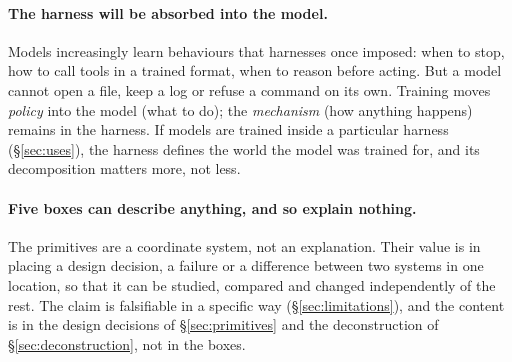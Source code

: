 \paragraph{The harness will be absorbed into the model.} Models increasingly learn behaviours that harnesses once imposed: when to stop, how to call tools in a trained format, when to reason before acting. But a model cannot open a file, keep a log or refuse a command on its own. Training moves \emph{policy} into the model (what to do); the \emph{mechanism} (how anything happens) remains in the harness. If models are trained inside a particular harness (\S\ref{sec:uses}), the harness defines the world the model was trained for, and its decomposition matters more, not less.

\paragraph{Five boxes can describe anything, and so explain nothing.} The primitives are a coordinate system, not an explanation. Their value is in placing a design decision, a failure or a difference between two systems in one location, so that it can be studied, compared and changed independently of the rest. The claim is falsifiable in a specific way (\S\ref{sec:limitations}), and the content is in the design decisions of \S\ref{sec:primitives} and the deconstruction of \S\ref{sec:deconstruction}, not in the boxes.
